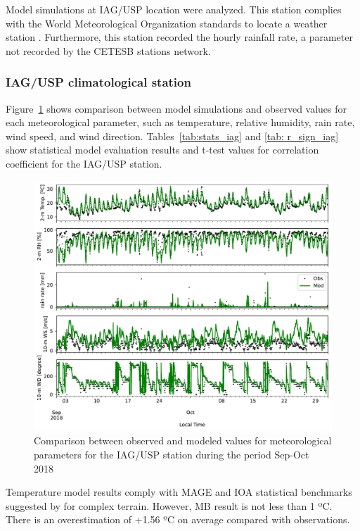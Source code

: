   Model simulations at IAG/USP location were analyzed. 
  This station complies with the World Meteorological Organization standards to locate a weather station \citep{WMO2018}.
  Furthermore, this station recorded the hourly rainfall rate, a parameter not recorded by the CETESB stations network.
  
  \subsubsection{IAG/USP climatological station}
Figure~\ref{fig:met_iag_comp} shows comparison between model simulations and observed values for each meteorological parameter, such as temperature, relative humidity, rain rate, wind speed, and wind direction.
Tables~\ref{tab:stats_iag} and \ref{tab: r_sign_iag} show statistical model evaluation results and t-test values for correlation coefficient for the IAG/USP station.

\begin{figure}[!hbt]
  \includegraphics[width=1\textwidth]{fig/met_IAG_comparison}
  \caption{Comparison between observed and modeled values for meteorological parameters for the IAG/USP station during the period Sep-Oct 2018}
  \label{fig:met_iag_comp}
\end{figure}

Temperature model results comply with MAGE and IOA statistical benchmarks suggested by \citet{Monk2019} for complex terrain.
However, MB result is not less than 1 ºC.
There is an overestimation of +1.56 ºC on average compared with observations.

